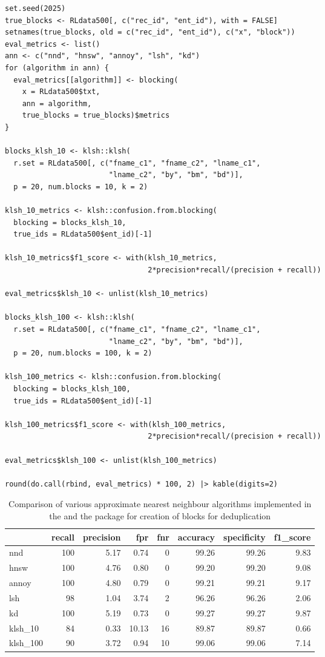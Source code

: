 \begin{verbatim}
set.seed(2025)
true_blocks <- RLdata500[, c("rec_id", "ent_id"), with = FALSE]
setnames(true_blocks, old = c("rec_id", "ent_id"), c("x", "block"))
eval_metrics <- list()
ann <- c("nnd", "hnsw", "annoy", "lsh", "kd")
for (algorithm in ann) {
  eval_metrics[[algorithm]] <- blocking(
    x = RLdata500$txt,
    ann = algorithm,
    true_blocks = true_blocks)$metrics
}

blocks_klsh_10 <- klsh::klsh(
  r.set = RLdata500[, c("fname_c1", "fname_c2", "lname_c1",
                        "lname_c2", "by", "bm", "bd")],
  p = 20, num.blocks = 10, k = 2)

klsh_10_metrics <- klsh::confusion.from.blocking(
  blocking = blocks_klsh_10, 
  true_ids = RLdata500$ent_id)[-1]

klsh_10_metrics$f1_score <- with(klsh_10_metrics, 
                                 2*precision*recall/(precision + recall))

eval_metrics$klsh_10 <- unlist(klsh_10_metrics)

blocks_klsh_100 <- klsh::klsh(
  r.set = RLdata500[, c("fname_c1", "fname_c2", "lname_c1",
                        "lname_c2", "by", "bm", "bd")],
  p = 20, num.blocks = 100, k = 2)

klsh_100_metrics <- klsh::confusion.from.blocking(
  blocking = blocks_klsh_100, 
  true_ids = RLdata500$ent_id)[-1]

klsh_100_metrics$f1_score <- with(klsh_100_metrics, 
                                 2*precision*recall/(precision + recall))

eval_metrics$klsh_100 <- unlist(klsh_100_metrics)

round(do.call(rbind, eval_metrics) * 100, 2) |> kable(digits=2) 
\end{verbatim}

\begin{table}

\caption{\label{tab:comparision}Comparison of various approximate nearest neighbour algorithms implemented in the  and the  package for creation of blocks for deduplication}
\centering
\begin{tabular}[t]{l|r|r|r|r|r|r|r}
\hline
  & recall & precision & fpr & fnr & accuracy & specificity & f1\_score\\
\hline
nnd & 100 & 5.17 & 0.74 & 0 & 99.26 & 99.26 & 9.83\\
\hline
hnsw & 100 & 4.76 & 0.80 & 0 & 99.20 & 99.20 & 9.08\\
\hline
annoy & 100 & 4.80 & 0.79 & 0 & 99.21 & 99.21 & 9.17\\
\hline
lsh & 98 & 1.04 & 3.74 & 2 & 96.26 & 96.26 & 2.06\\
\hline
kd & 100 & 5.19 & 0.73 & 0 & 99.27 & 99.27 & 9.87\\
\hline
klsh\_10 & 84 & 0.33 & 10.13 & 16 & 89.87 & 89.87 & 0.66\\
\hline
klsh\_100 & 90 & 3.72 & 0.94 & 10 & 99.06 & 99.06 & 7.14\\
\hline
\end{tabular}
\end{table}

